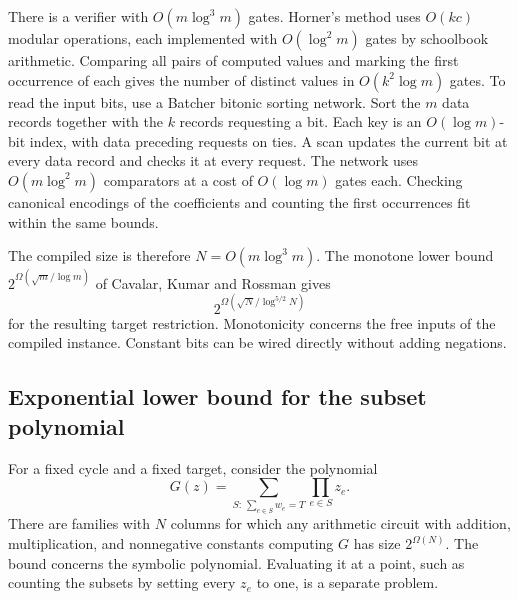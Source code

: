 \documentclass[11pt,a4paper]{article}
\numberwithin{equation}{section}
\begin{document}
There is a verifier with \(O(m\log^3 m)\) gates. Horner's method uses \(O(kc)\) modular operations, each implemented with \(O(\log^2 m)\) gates by schoolbook arithmetic. Comparing all pairs of computed values and marking the first occurrence of each gives the number of distinct values in \(O(k^2\log m)\) gates. To read the input bits, use a Batcher bitonic sorting network. Sort the \(m\) data records together with the \(k\) records requesting a bit. Each key is an \(O(\log m)\)-bit index, with data preceding requests on ties. A scan updates the current bit at every data record and checks it at every request. The network uses \(O(m\log^2 m)\) comparators at a cost of \(O(\log m)\) gates each. Checking canonical encodings of the coefficients and counting the first occurrences fit within the same bounds.

The compiled size is therefore \(N=O(m\log^3 m)\). The monotone lower bound \(2^{\Omega(\sqrt m/\log m)}\) of Cavalar, Kumar and Rossman gives
\begin{equation}\label{eq:monotone-boolean-bound}
2^{\Omega(\sqrt N/\log^{5/2}N)}
\end{equation}
for the resulting target restriction. Monotonicity concerns the free inputs of the compiled instance. Constant bits can be wired directly without adding negations.

\subsection{Exponential lower bound for the subset polynomial}\label{exponential-lower-bound-for-the-subset-polynomial}

For a fixed cycle and a fixed target, consider the polynomial
\begin{equation}\label{eq:subset-polynomial}
G(z)=\sum_{S:\,\sum_{e\in S}w_e=T}\prod_{e\in S}z_e .
\end{equation}
There are families with \(N\) columns for which any arithmetic circuit with addition, multiplication, and nonnegative constants computing \(G\) has size \(2^{\Omega(N)}\). The bound concerns the symbolic polynomial. Evaluating it at a point, such as counting the subsets by setting every \(z_e\) to one, is a separate problem.
\end{document}
